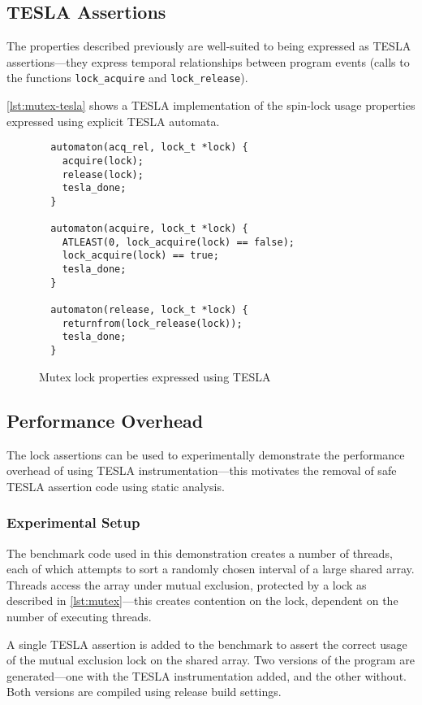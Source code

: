 \subsection{TESLA Assertions}

The properties described previously are well-suited to being expressed as TESLA
assertions---they express temporal relationships between program events (calls
to the functions \texttt{lock_acquire} and \texttt{lock_release}).

\autoref{lst:mutex-tesla} shows a TESLA implementation of the spin-lock
usage properties expressed using explicit TESLA automata.
\begin{figure}[ht]
  \begin{verbatim}
  automaton(acq_rel, lock_t *lock) {
    acquire(lock);
    release(lock);
    tesla_done;
  }

  automaton(acquire, lock_t *lock) {
    ATLEAST(0, lock_acquire(lock) == false);
    lock_acquire(lock) == true;
    tesla_done;
  }

  automaton(release, lock_t *lock) {
    returnfrom(lock_release(lock));
    tesla_done;
  }
  \end{verbatim}
  \caption{Mutex lock properties expressed using TESLA}
  \label{lst:mutex-tesla}
\end{figure}

\subsection{Performance Overhead}

The lock assertions can be used to experimentally demonstrate the
performance overhead of using TESLA instrumentation---this motivates the
removal of safe TESLA assertion code using static analysis.

\subsubsection{Experimental Setup}

The benchmark code used in this demonstration creates a number of
threads, each of which attempts to sort a randomly chosen interval of a
large shared array. Threads access the array under mutual exclusion,
protected by a lock as described in \autoref{lst:mutex}---this creates
contention on the lock, dependent on the number of executing threads.

A single TESLA assertion is added to the benchmark to assert the correct
usage of the mutual exclusion lock on the shared array. Two versions of
the program are generated---one with the TESLA instrumentation added,
and the other without. Both versions are compiled using release build
settings.


